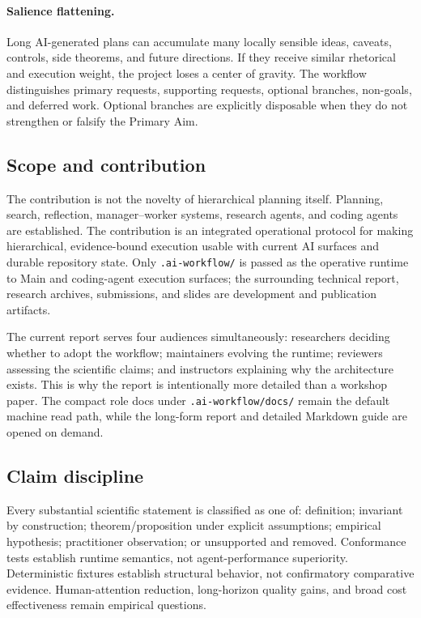 \documentclass[11pt,a4paper]{article}
\begin{document}
\paragraph{Salience flattening.} Long AI-generated plans can accumulate many locally sensible ideas, caveats, controls, side theorems, and future directions. If they receive similar rhetorical and execution weight, the project loses a center of gravity. The workflow distinguishes primary requests, supporting requests, optional branches, non-goals, and deferred work. Optional branches are explicitly disposable when they do not strengthen or falsify the Primary Aim.

\subsection{Scope and contribution}
The contribution is not the novelty of hierarchical planning itself. Planning, search, reflection, manager--worker systems, research agents, and coding agents are established. The contribution is an integrated operational protocol for making hierarchical, evidence-bound execution usable with current AI surfaces and durable repository state. Only \texttt{.ai-workflow/} is passed as the operative runtime to Main and coding-agent execution surfaces; the surrounding technical report, research archives, submissions, and slides are development and publication artifacts.

The current report serves four audiences simultaneously: researchers deciding whether to adopt the workflow; maintainers evolving the runtime; reviewers assessing the scientific claims; and instructors explaining why the architecture exists. This is why the report is intentionally more detailed than a workshop paper. The compact role docs under \texttt{.ai-workflow/docs/} remain the default machine read path, while the long-form report and detailed Markdown guide are opened on demand.

\subsection{Claim discipline}
Every substantial scientific statement is classified as one of: definition; invariant by construction; theorem/proposition under explicit assumptions; empirical hypothesis; practitioner observation; or unsupported and removed. Conformance tests establish runtime semantics, not agent-performance superiority. Deterministic fixtures establish structural behavior, not confirmatory comparative evidence. Human-attention reduction, long-horizon quality gains, and broad cost effectiveness remain empirical questions.
\end{document}
